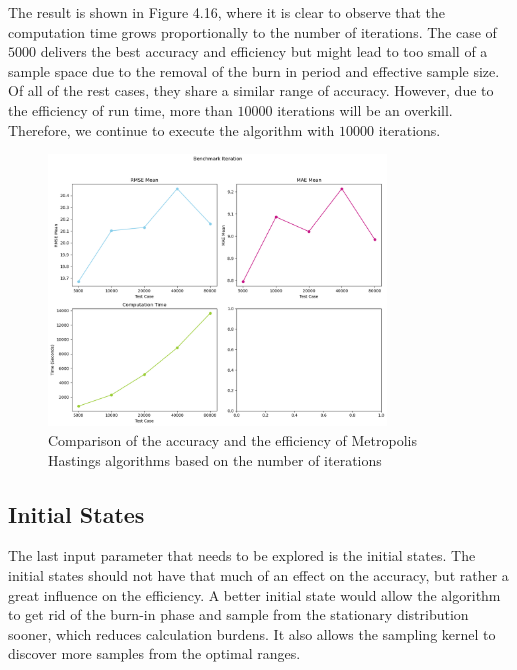 The result is shown in Figure 4.16, where it is clear to observe that the computation time grows proportionally to the number of iterations. The case of $5000$ delivers the best accuracy and efficiency but might lead to too small of a sample space due to the removal of the burn in period and effective sample size. Of all of the rest cases, they share a similar range of accuracy. However, due to the efficiency of run time, more than $10000$ iterations will be an overkill. Therefore, we continue to execute the algorithm with $10000$ iterations. 

\begin{figure}
    \centering
    \includegraphics[width=0.8\textwidth]{figures/basic_mh/benchmark/iteration.png}
    \captionsetup{width=.8\textwidth}
    \caption{Comparison of the accuracy and the efficiency of Metropolis Hastings algorithms based on the number of iterations}
    \label{fig:enter-label}
\end{figure}


\subsection{Initial States}
The last input parameter that needs to be explored is the initial states. The initial states should not have that much of an effect on the accuracy, but rather a great influence on the efficiency.\cite{mcmc_practice} A better initial state would allow the algorithm to get rid of the burn-in phase and sample from the stationary distribution sooner, which reduces calculation burdens. It also allows the sampling kernel to discover more samples from the optimal ranges.

